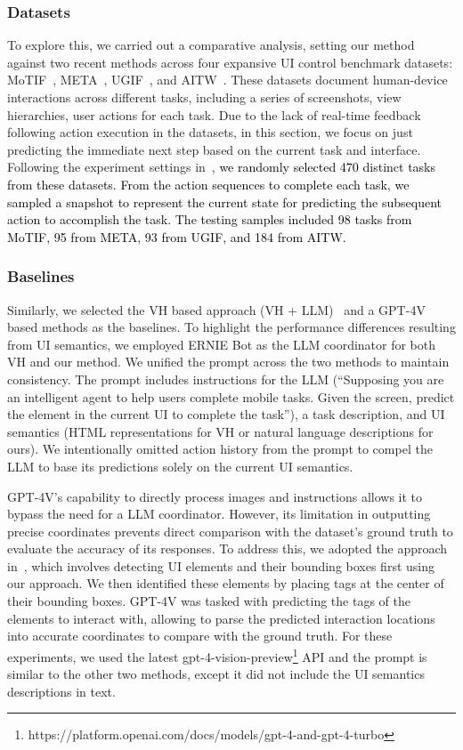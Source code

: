 \subsubsection{Datasets}
To explore this, we carried out a comparative analysis, setting our method against two recent methods across four expansive UI control benchmark datasets: MoTIF~\cite{burns2021mobile}, META~\cite{sun2022meta}, UGIF~\cite{venkatesh2022ugif}, and AITW~\cite{rawles2023androidinthewild}. These datasets document human-device interactions across different tasks, including a series of screenshots, view hierarchies, user actions for each task. Due to the lack of real-time feedback following action execution in the datasets, in this section, we focus on just predicting the immediate next step based on the current task and interface. Following the experiment settings in~\cite{rawles2023androidinthewild}, \textcolor{black}{we randomly selected 470 distinct tasks from these datasets. From the action sequences to complete each task, we sampled a snapshot to represent the current state for predicting the subsequent action to accomplish the task. The testing samples included 98 tasks from MoTIF, 95 from META, 93 from UGIF, and 184 from AITW.}

\subsubsection{Baselines}
Similarly, we selected the VH based approach (VH + LLM)~\cite{wang2023enabling} and a GPT-4V~\cite{yan2023gpt} based methods as the baselines. To highlight the performance differences resulting from UI semantics, we employed ERNIE Bot as the LLM coordinator for both VH and our method. We unified the prompt across the two methods to maintain consistency. The prompt includes instructions for the LLM (``Supposing you are an intelligent agent to help users complete mobile tasks. Given the screen, predict the element in the current UI to complete the task''), a task description, and UI semantics (HTML representations for VH or natural language descriptions for ours). We intentionally omitted action history from the prompt to compel the LLM to base its predictions solely on the current UI semantics.

GPT-4V's capability to directly process images and instructions allows it to bypass the need for a LLM coordinator. However, its limitation in outputting precise coordinates prevents direct comparison with the dataset's ground truth to evaluate the accuracy of its responses. To address this, we adopted the approach in~\cite{yang2023set}, which involves detecting UI elements and their bounding boxes first using our approach. We then identified these elements by placing tags at the center of their bounding boxes. GPT-4V was tasked with predicting the tags of the elements to interact with, allowing to parse the predicted interaction locations into accurate coordinates to compare with the ground truth. For these experiments, we used the latest gpt-4-vision-preview\footnote{https://platform.openai.com/docs/models/gpt-4-and-gpt-4-turbo} API and the prompt is similar to the other two methods, except it did not include the UI semantics descriptions in text.

